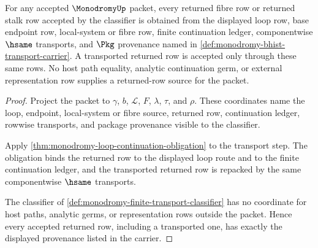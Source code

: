 \begin{theorem}
\label{thm:monodromy-returned-row-provenance-exactness}
For any accepted $\MonodromyUp$ packet, every returned fibre row or returned stalk row accepted by the classifier is obtained from the displayed loop row, base endpoint row, local-system or fibre row, finite continuation ledger, componentwise $\hsame$ transports, and $\Pkg$ provenance named in \autoref{def:monodromy-bhist-transport-carrier}. A transported returned row is accepted only through these same rows. No host path equality, analytic continuation germ, or external representation row supplies a returned-row source for the packet.
\end{theorem}
\begin{proof}
Project the packet to $\gamma$, $b$, $\mathcal L$, $F$, $\lambda$, $\tau$, and $\rho$. These coordinates name the loop, endpoint, local-system or fibre source, returned row, continuation ledger, rowwise transports, and package provenance visible to the classifier.

Apply \autoref{thm:monodromy-loop-continuation-obligation} to the transport step. The obligation binds the returned row to the displayed loop route and to the finite continuation ledger, and the transported returned row is repacked by the same componentwise $\hsame$ transports.

The classifier of \autoref{def:monodromy-finite-transport-classifier} has no coordinate for host paths, analytic germs, or representation rows outside the packet. Hence every accepted returned row, including a transported one, has exactly the displayed provenance listed in the carrier.
\end{proof}

